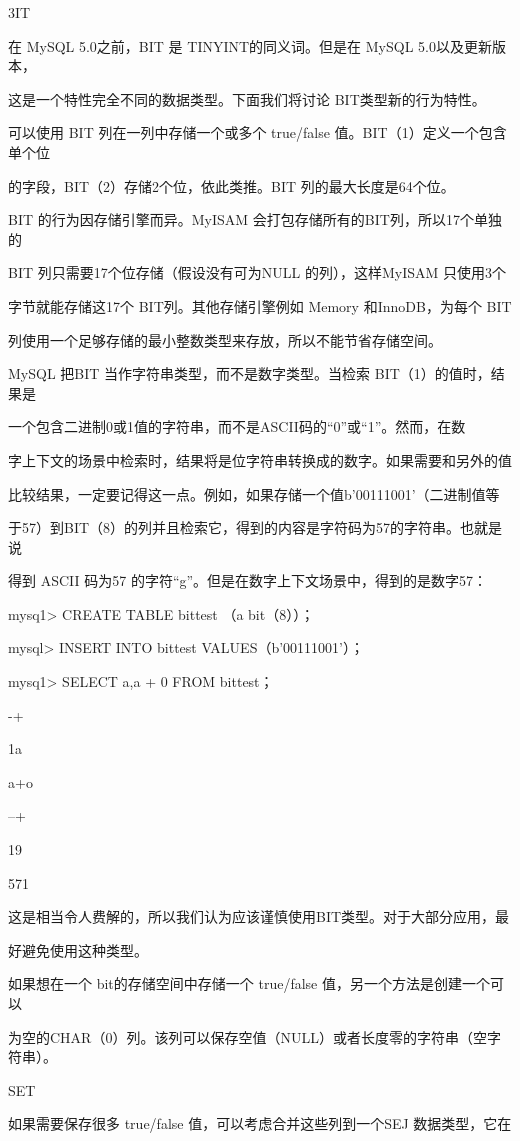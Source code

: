 3IT

在 MySQL 5.0之前，BIT 是 TINYINT的同义词。但是在 MySQL 5.0以及更新版本，

这是一个特性完全不同的数据类型。下面我们将讨论 BIT类型新的行为特性。

可以使用 BIT 列在一列中存储一个或多个 true/false 值。BIT（1）定义一个包含单个位

的字段，BIT（2）存储2个位，依此类推。BIT 列的最大长度是64个位。

BIT 的行为因存储引擎而异。MyISAM 会打包存储所有的BIT列，所以17个单独的

BIT 列只需要17个位存储（假设没有可为NULL 的列），这样MyISAM 只使用3个

字节就能存储这17个 BIT列。其他存储引擎例如 Memory 和InnoDB，为每个 BIT

列使用一个足够存储的最小整数类型来存放，所以不能节省存储空间。

MySQL 把BIT 当作字符串类型，而不是数字类型。当检索 BIT（1）的值时，结果是

一个包含二进制0或1值的字符串，而不是ASCII码的“0”或“1”。然而，在数

字上下文的场景中检索时，结果将是位字符串转换成的数字。如果需要和另外的值

比较结果，一定要记得这一点。例如，如果存储一个值b'00111001'（二进制值等

于57）到BIT（8）的列并且检索它，得到的内容是字符码为57的字符串。也就是说

得到 ASCII 码为57 的字符“g”。但是在数字上下文场景中，得到的是数字57：

mysq1> CREATE TABLE bittest （a bit（8））；

mysql> INSERT INTO bittest VALUES（b'00111001'）；

mysq1> SELECT a,a + 0 FROM bittest；

-+

1a

a+o

--+

19

571

这是相当令人费解的，所以我们认为应该谨慎使用BIT类型。对于大部分应用，最

好避免使用这种类型。

如果想在一个 bit的存储空间中存储一个 true/false 值，另一个方法是创建一个可以

为空的CHAR（0）列。该列可以保存空值（NULL）或者长度零的字符串（空字符串）。

SET

如果需要保存很多 true/false 值，可以考虑合并这些列到一个SEJ 数据类型，它在

